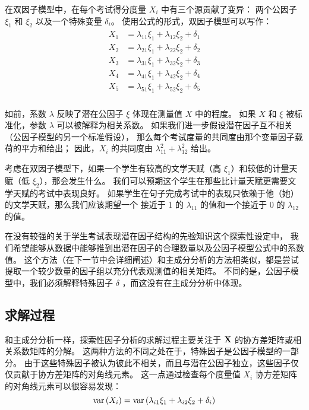 在双因子模型中，在每个考试得分度量 $ X_i $ 中有三个源贡献了变异：
两个公因子 $ \xi_1 $ 和 $ \xi_2 $ 以及一个特殊变量 $ \delta_i $。
使用公式的形式，双因子模型可以写作：
\begin{align}
    \begin{split}
        X_1 & = \lambda_{11}\xi_1 + \lambda_{12}\xi_2 + \delta_1 \\
        X_2 & = \lambda_{21}\xi_1 + \lambda_{22}\xi_2 + \delta_2 \\
        X_3 & = \lambda_{31}\xi_1 + \lambda_{32}\xi_2 + \delta_3 \\
        X_4 & = \lambda_{41}\xi_1 + \lambda_{42}\xi_2 + \delta_4 \\
        X_5 & = \lambda_{51}\xi_1 + \lambda_{52}\xi_2 + \delta_5 \\
    \end{split}
\end{align}

如前，系数 $ \lambda $ 反映了潜在公因子 $ \xi $ 体现在测量值 $ X $ 中的程度。
如果 $ X $ 和 $ \xi $ 被标准化，参数 $ \lambda $ 可以被解释为相关系数。
如果我们进一步假设潜在因子互不相关（公因子模型的另一个标准假设），
那么每个考试度量的共同度由那个变量因子载荷的平方和给出；
因此，$ X_i $ 的共同度由 $ \lambda_{11}^2 + \lambda_{12}^2 $ 给出。

考虑在双因子模型下，如果一个学生有较高的文学天赋（高 $ \xi_1 $）和较低的计量天赋（低 $ \xi_2 $），那会发生什么。
我们可以预期这个学生在那些比计量天赋更需要文学天赋的考试中表现良好。
如果学生在句子完成考试中的表现只依赖于他（她）的文学天赋，那么我们应该期望一个
接近于 1 的 $ \lambda_{11} $ 的值和一个接近于 0 的 $ \lambda_{12} $ 的值。

在没有较强的关于学生考试表现潜在因子结构的先验知识这个探索性设定中，
我们希望能够从数据中能够推到出潜在因子的合理数量以及公因子模型公式中的系数值。
这个方法（在下一节中会详细阐述）和主成分分析的方法相类似，都是尝试提取一个较少数量的因子组以充分代表观测值的相关矩阵。
不同的是，公因子模型中，我们必须解释特殊因子 $ \delta $ ，而这没有在主成分分析中体现。

\subsection{求解过程}

和主成分分析一样，探索性因子分析的求解过程主要关注于 $ \mathbf{X} $ 的协方差矩阵或相关系数矩阵的分解。
这两种方法的不同之处在于，特殊因子是公因子模型的一部分。
由于这些特殊因子被认为彼此不相关，而且与潜在公因子独立，这些因子仅仅贡献于协方差矩阵的对角线元素。
这一点通过检查每个度量值 $ X_i $ 协方差矩阵的对角线元素可以很容易发现：
\begin{equation}
    \mathrm{var}\left({X_i}\right) = \mathrm{var}\left({\lambda_{i1}\xi_1 + \lambda_{i2}\xi_2 + \delta_i}\right)
\end{equation}

